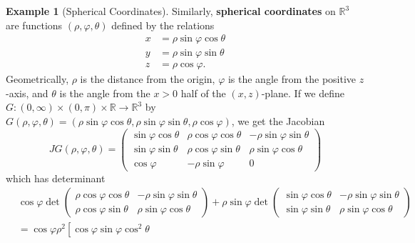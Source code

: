 \documentclass[reqno]{amsart}
\theoremstyle{plain}%
\theoremstyle{definition}
\newtheorem{example}[theorem]{Example}
\theoremstyle{remark}
\begin{document}
        \begin{example}[Spherical Coordinates]
          Similarly, \textbf{spherical coordinates} on $\mathbb{R}^3$ are functions
          $\left( \rho , \varphi, \theta \right) $ defined by the relations
          \begin{align*}
              x &= \rho  \sin \varphi \cos \theta\\
              y &= \rho  \sin \varphi \sin \theta\\
              z &= \rho  \cos \varphi.
          \end{align*}
          Geometrically, $\rho $ is the distance from the origin, $\varphi$ is the
          angle from the positive $z$-axis, and $\theta$ is the angle from the
          $x>0$ half of the $\left( x,z \right) $-plane. If we define
          $G  \colon \left( 0, \infty \right) \times \left( 0, \pi \right) \times
          \mathbb{R} \to \mathbb{R}^3$ by
          $G\left( \rho , \varphi, \theta \right) 
          = \left( \rho  \sin \varphi \cos \theta, \rho  \sin \varphi \sin \theta,
          \rho  \cos \varphi\right) $, we get the Jacobian
          \[
          JG \left( \rho , \varphi, \theta \right) 
          =
          \begin{pmatrix} 
              \sin \varphi \cos \theta & \rho  \cos \varphi \cos \theta & - \rho
              \sin \varphi \sin \theta\\
              \sin \varphi \sin \theta & \rho  \cos \varphi \sin \theta & \rho
              \sin \varphi \cos \theta\\
              \cos \varphi & - \rho \sin \varphi & 0
          \end{pmatrix} 
          \] 
          which has determinant
          \begin{align*}
          &\cos \varphi \det \begin{pmatrix} 
              \rho \cos \varphi \cos \theta & - \rho  \sin \varphi \sin \theta\\
              \rho \cos \varphi \sin \theta & \rho  \sin \varphi \cos \theta
          \end{pmatrix} + \rho  \sin \varphi
          \det \begin{pmatrix} 
              \sin \varphi \cos \theta & - \rho  \sin \varphi \sin \theta\\
              \sin \varphi \sin \theta & \rho  \sin \varphi \cos \theta
          \end{pmatrix}\\
          &= \cos \varphi \rho^2 \left[ \cos \varphi \sin \varphi \cos^2 \theta

\end{align*}
\end{example}
\end{document}
